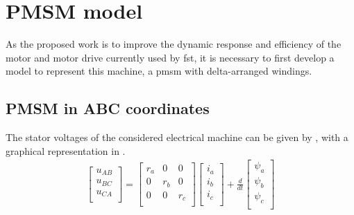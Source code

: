 \section{PMSM model}\label{section:PMSM model}
As the proposed work is to improve the dynamic response and efficiency of the motor and motor drive currently used by \gls{fst}, it is necessary to first develop a model to represent this machine, a \gls{pmsm} with delta-arranged windings.

\subsection{PMSM in ABC coordinates}
The stator voltages of the considered electrical machine can be given by , with a graphical representation in .
\begin{equation}
	\begin{aligned}
		\begin{bmatrix}
			u_{AB} \\
			u_{BC} \\
			u_{CA} \\
		\end{bmatrix}
		=
		\begin{bmatrix}
			r_a & 0   & 0   \\
			0   & r_b & 0   \\
			0   & 0   & r_c \\
		\end{bmatrix}
		\begin{bmatrix}
			i_a \\
			i_b \\
			i_c \\
		\end{bmatrix}
		+
		\frac{d}{dt}
		\begin{bmatrix}
			\psi_a \\
			\psi_b \\
			\psi_c \\
		\end{bmatrix}
	\end{aligned}
	\label{eq:flx_voltage_balance}%
\end{equation}

